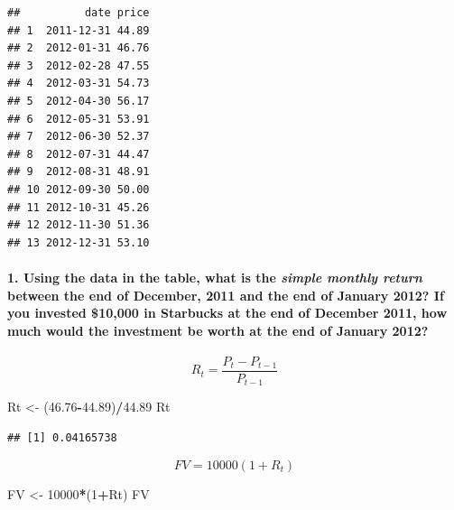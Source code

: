\documentclass[]{article}
\newenvironment{Shaded}{\begin{snugshade}}{\end{snugshade}}
\newcommand{\DecValTok}[1]{\textcolor[rgb]{0.00,0.00,0.81}{#1}}
\newcommand{\FloatTok}[1]{\textcolor[rgb]{0.00,0.00,0.81}{#1}}
\newcommand{\StringTok}[1]{\textcolor[rgb]{0.31,0.60,0.02}{#1}}
\newcommand{\OperatorTok}[1]{\textcolor[rgb]{0.81,0.36,0.00}{\textbf{#1}}}
\newcommand{\NormalTok}[1]{#1}
\let\oldparagraph\paragraph
\renewcommand{\paragraph}[1]{\oldparagraph{#1}\mbox{}}
\begin{document}
\begin{verbatim}
##          date price
## 1  2011-12-31 44.89
## 2  2012-01-31 46.76
## 3  2012-02-28 47.55
## 4  2012-03-31 54.73
## 5  2012-04-30 56.17
## 6  2012-05-31 53.91
## 7  2012-06-30 52.37
## 8  2012-07-31 44.47
## 9  2012-08-31 48.91
## 10 2012-09-30 50.00
## 11 2012-10-31 45.26
## 12 2012-11-30 51.36
## 13 2012-12-31 53.10
\end{verbatim}

\paragraph{\texorpdfstring{1. Using the data in the table, what is the
\emph{simple monthly return} between the end of December, 2011 and the
end of January 2012? If you invested \$10,000 in Starbucks at the end of
December 2011, how much would the investment be worth at the end of
January
2012?}{1. Using the data in the table, what is the simple monthly return between the end of December, 2011 and the end of January 2012? If you invested \$10,000 in Starbucks at the end of December 2011, how much would the investment be worth at the end of January 2012?}}\label{using-the-data-in-the-table-what-is-the-simple-monthly-return-between-the-end-of-december-2011-and-the-end-of-january-2012-if-you-invested-10000-in-starbucks-at-the-end-of-december-2011-how-much-would-the-investment-be-worth-at-the-end-of-january-2012}

\[R_t = \frac{P_t - P_{t-1}}{P_{t-1}}\]

\begin{Shaded}
\begin{Highlighting}[]
\NormalTok{Rt <-}\StringTok{ }\NormalTok{(}\FloatTok{46.76}\OperatorTok{-}\FloatTok{44.89}\NormalTok{)}\OperatorTok{/}\FloatTok{44.89}
\NormalTok{Rt}
\end{Highlighting}
\end{Shaded}

\begin{verbatim}
## [1] 0.04165738
\end{verbatim}

\[ FV = 10000(1+R_t)\]

\begin{Shaded}
\begin{Highlighting}[]
\NormalTok{FV <-}\StringTok{ }\DecValTok{10000}\OperatorTok{*}\NormalTok{(}\DecValTok{1}\OperatorTok{+}\NormalTok{Rt)}
\NormalTok{FV}
\end{Highlighting}
\end{Shaded}
\end{document}
